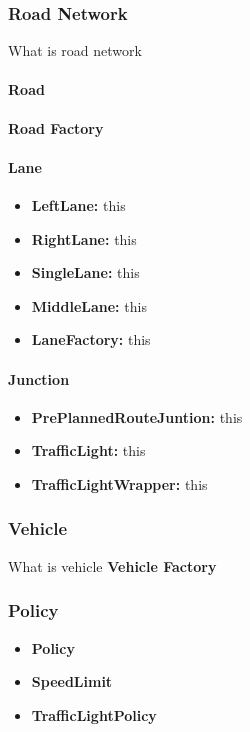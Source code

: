 \documentclass[11pt]{article}
\begin{document}
\subsubsection{Road Network}
What is road network
    \paragraph{Road}
    \textbf{Road Factory}\\
    \paragraph{Lane}
    \begin{itemize}[noitemsep]
    \item \textbf{LeftLane:} this  
    \item \textbf{RightLane:} this
    \item \textbf{SingleLane:} this
    \item \textbf{MiddleLane:} this  
    \item \textbf{LaneFactory:} this
    \end{itemize}
    \paragraph{Junction}
    \begin{itemize}[noitemsep]
    \item \textbf{PrePlannedRouteJuntion:} this  
    \item \textbf{TrafficLight:} this
    \item \textbf{TrafficLightWrapper:} this
    \end{itemize}
    
\subsubsection{Vehicle}
What is vehicle
\textbf{Vehicle Factory}\\


\subsubsection{Policy}        
\begin{itemize}[noitemsep]
\item \textbf{Policy} 
\item \textbf{SpeedLimit} 
\item \textbf{TrafficLightPolicy}
\end{itemize}
\end{document}
